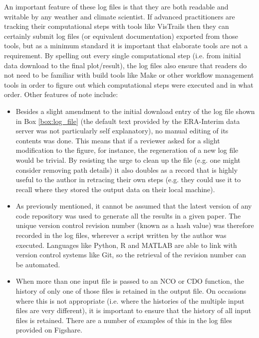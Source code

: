 An important feature of these log files is that they are both readable and writable by any weather and climate scientist. If advanced practitioners are tracking their computational steps with tools like VisTrails then they can certainly submit log files (or equivalent documentation) exported from those tools, but as a minimum standard it is important that elaborate tools are not a requirement. By spelling out every single computational step (i.e. from initial data download to the final plot/result), the log files also ensure that readers do not need to be familiar with build tools like Make or other workflow management tools in order to figure out which computational steps were executed and in what order. Other features of note include:
\begin{itemize}
\item Besides a slight amendment to the initial download entry of the log file shown in Box \ref{box:log_file} (the default text provided by the ERA-Interim data server was not particularly self explanatory), no manual editing of its contents was done. This means that if a reviewer asked for a slight modification to the figure, for instance, the regeneration of a new log file would be trivial. By resisting the urge to clean up the file (e.g. one might consider removing path details) it also doubles as a record that is highly useful to the author in retracing their own steps (e.g. they could use it to recall where they stored the output data on their local machine).
\item As previously mentioned, it cannot be assumed that the latest version of any code repository was used to generate all the results in a given paper. The unique version control revision number (known as a hash value) was therefore recorded in the log files, wherever a script written by the author was executed. Languages like Python, R and MATLAB are able to link with version control systems like Git, so the retrieval of the revision number can be automated.
\item When more than one input file is passed to an NCO or CDO function, the history of only one of those files is retained in the output file. On occasions where this is not appropriate (i.e. where the histories of the multiple input files are very different), it is important to ensure that the history of all input files is retained. There are a number of examples of this in the log files provided on Figshare. 
\end{itemize}
  
